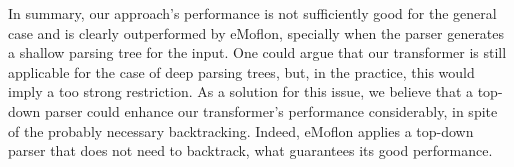 In summary, our approach's performance is not sufficiently good for the general case and is clearly outperformed by eMoflon, specially when the parser generates a shallow parsing tree for the input. One could argue that our transformer is still applicable for the case of deep parsing trees, but, in the practice, this would imply a too strong restriction. As a solution for this issue, we believe that a top-down parser could enhance our transformer's performance considerably, in spite of the probably necessary backtracking. Indeed, eMoflon applies a top-down parser that does not need to backtrack, what guarantees its good performance.